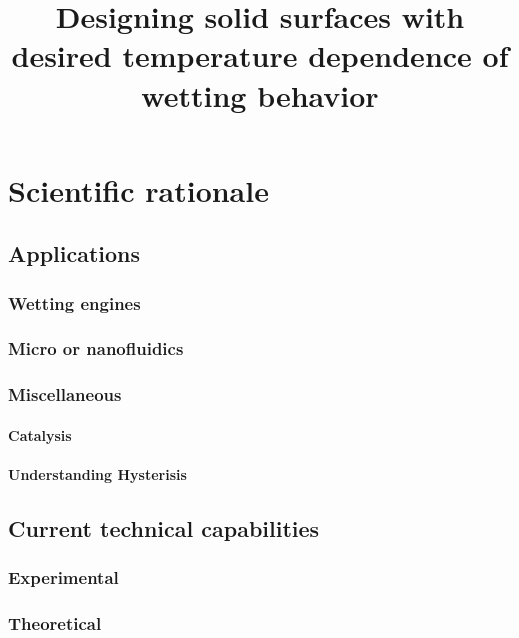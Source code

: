 \documentclass[a4paper,12pt,single,pdftex]{article}
\title{Designing solid surfaces with desired temperature dependence of wetting behavior}
\begin{document}
 
\maketitle
\newpage

\label{ID_1723255651}\label{ID_268635931}\section{Scientific rationale}

\label{ID_1616607157}\subsection{Applications}

\label{ID_564676847}\subsubsection{Wetting engines}

\label{ID_1321830436}\subsubsection{Micro or nanofluidics}

\label{ID_278738019}\subsubsection{Miscellaneous}

\label{ID_1903445769}\paragraph{Catalysis}

\label{ID_731793233}\paragraph{Understanding Hysterisis}

\label{ID_235950698}\subsection{Current technical capabilities}

\label{ID_1442355972}\subsubsection{Experimental}

\label{ID_474314366}\subsubsection{Theoretical}
\end{document}
